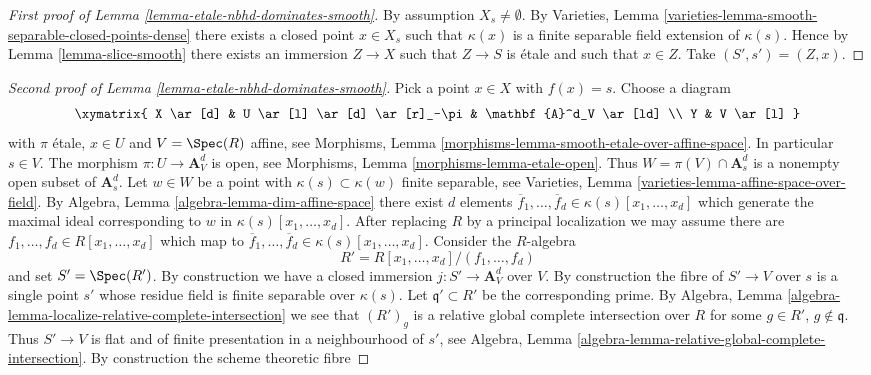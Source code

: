\begin{proof}[First proof of Lemma \ref{lemma-etale-nbhd-dominates-smooth}]
By assumption $X_s \not = \emptyset$. By
Varieties, Lemma \ref{varieties-lemma-smooth-separable-closed-points-dense}
there exists a closed point $x \in X_s$ such that $\kappa(x)$
is a finite separable field extension of $\kappa(s)$.
Hence by
Lemma \ref{lemma-slice-smooth}
there exists an immersion $Z \to X$ such that $Z \to S$ is \'etale and such
that $x \in Z$. Take $(S' , s') = (Z, x)$.
\end{proof}

\begin{proof}[Second proof of Lemma \ref{lemma-etale-nbhd-dominates-smooth}]
Pick a point $x \in X$ with $f(x) = s$.
Choose a diagram
$$
\xymatrix{
X \ar[d] & U \ar[l] \ar[d] \ar[r]_-\pi & \mathbf{A}^d_V \ar[ld] \\
Y & V \ar[l]
}
$$
with $\pi$ \'etale, $x \in U$ and $V = \Spec(R)$ affine, see
Morphisms, Lemma \ref{morphisms-lemma-smooth-etale-over-affine-space}.
In particular $s \in V$. The morphism
$\pi : U \to \mathbf{A}^d_V$ is open, see
Morphisms, Lemma \ref{morphisms-lemma-etale-open}.
Thus $W = \pi(V) \cap \mathbf{A}^d_s$ is a nonempty open subset of
$\mathbf{A}^d_s$. Let $w \in W$ be a point with $\kappa(s) \subset \kappa(w)$
finite separable, see
Varieties, Lemma \ref{varieties-lemma-affine-space-over-field}.
By
Algebra, Lemma \ref{algebra-lemma-dim-affine-space}
there exist $d$ elements
$\overline{f}_1, \ldots, \overline{f}_d \in \kappa(s)[x_1, \ldots, x_d]$
which generate the maximal ideal corresponding to $w$ in
$\kappa(s)[x_1, \ldots, x_d]$.
After replacing $R$ by a principal localization
we may assume there are $f_1, \ldots, f_d \in R[x_1, \ldots, x_d]$
which map to
$\overline{f}_1, \ldots, \overline{f}_d \in \kappa(s)[x_1, \ldots, x_d]$.
Consider the $R$-algebra
$$
R' = R[x_1, \ldots, x_d]/(f_1, \ldots, f_d)
$$
and set $S' = \Spec(R')$. By construction we have a closed
immersion $j : S' \to \mathbf{A}^d_V$ over $V$.
By construction the fibre of $S' \to V$ over $s$ is a single
point $s'$ whose residue field is finite separable over $\kappa(s)$.
Let $\mathfrak q' \subset R'$ be the corresponding prime. By
Algebra, Lemma \ref{algebra-lemma-localize-relative-complete-intersection}
we see that $(R')_g$ is a relative global complete intersection over $R$
for some $g \in R'$, $g \not \in \mathfrak q$.
Thus $S' \to V$ is flat and of finite presentation in a
neighbourhood of $s'$, see
Algebra, Lemma \ref{algebra-lemma-relative-global-complete-intersection}.
By construction the scheme theoretic fibre

\end{proof}
